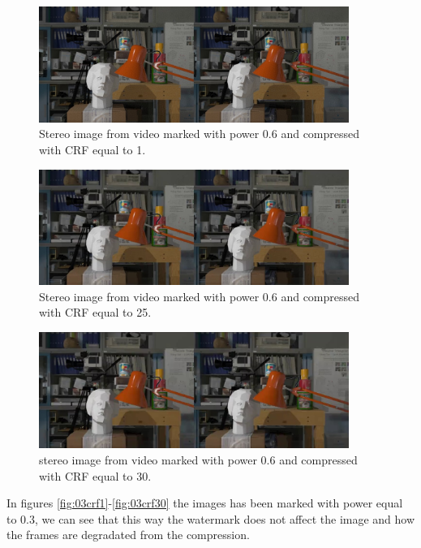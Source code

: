 \begin{figure}[h!]
\centering
\includegraphics[width=0.9\textwidth]{./img/06_crf1_gt.jpg}
\caption{\small{Stereo image from video marked with power 0.6 and compressed with CRF equal to 1. }}
\label{fig:06crf1}
\end{figure}
\begin{figure}[h!]
\centering
\includegraphics[width=0.9\textwidth]{./img/06_crf25_gt.jpg}
\caption{\small{Stereo image from video marked with power 0.6 and compressed with CRF equal to 25. }}
\label{fig:06crf25}
\end{figure}
\begin{figure}[h!]
\centering
\includegraphics[width=0.9\textwidth]{./img/06_crf30_gt.jpg}
\caption{\small{stereo image from video marked with power 0.6 and compressed with CRF equal to 30. }}
\label{fig:06crf30}
\end{figure}

\clearpage

In figures \ref{fig:03crf1}-\ref{fig:03crf30} the images has been marked with power equal to 0.3, we can see that this way the watermark does not affect the image and how the frames are degradated from the compression.

